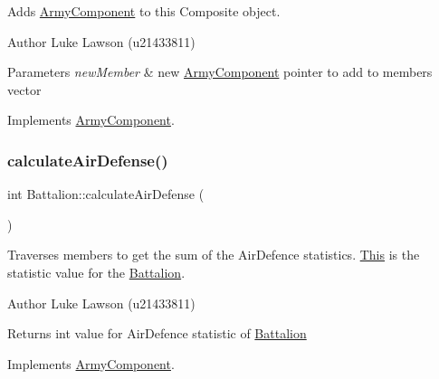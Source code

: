 Adds \mbox{\hyperlink{class_army_component}{Army\+Component}} to this Composite object. 

\begin{DoxyAuthor}{Author}
Luke Lawson (u21433811) 
\end{DoxyAuthor}

\begin{DoxyParams}{Parameters}
{\em new\+Member} & new \mbox{\hyperlink{class_army_component}{Army\+Component}} pointer to add to members vector \\
\hline
\end{DoxyParams}


Implements \mbox{\hyperlink{class_army_component_aae30fdd85af73102e011cb053ddb96b3}{Army\+Component}}.

\mbox{\label{class_battalion_aa7e5340aa0d4547fcc7a4ecfd4fb31cb}} 
\subsubsection{\texorpdfstring{calculateAirDefense()}{calculateAirDefense()}}
{\footnotesize\ttfamily int Battalion\+::calculate\+Air\+Defense (\begin{DoxyParamCaption}{ }\end{DoxyParamCaption})\hspace{0.3cm}{\ttfamily [virtual]}}



Traverses members to get the sum of the Air\+Defence statistics. \mbox{\hyperlink{class_this}{This}} is the statistic value for the \mbox{\hyperlink{class_battalion}{Battalion}}. 

\begin{DoxyAuthor}{Author}
Luke Lawson (u21433811) 
\end{DoxyAuthor}
\begin{DoxyReturn}{Returns}
int value for Air\+Defence statistic of \mbox{\hyperlink{class_battalion}{Battalion}} 
\end{DoxyReturn}


Implements \mbox{\hyperlink{class_army_component_a9f6671dd8cd4037722f592f0fa86e3a2}{Army\+Component}}.

\mbox{\label{class_battalion_ae3489e11413500aa1c1878f0651bebdc}} 
